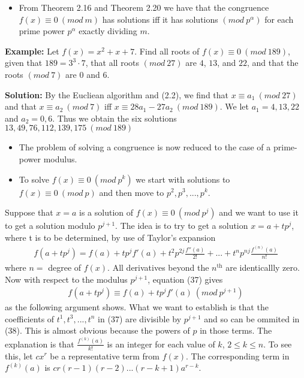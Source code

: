\documentclass[a4paper]{article}
\begin{document}
\begin{itemize}
    \item From Theorem 2.16 and Theorem 2.20 we have that the congruence $f(x)\equiv 0\ (mod\ m)$ has solutions iff it has solutions $(mod\ p^\alpha)$ for each prime power $p^\alpha$ exactly dividing $m$.
\end{itemize}

\textbf{Example:}
Let $f(x)=x^2+x+7$. Find all roots of $f(x)\equiv 0\ (mod\ 189)$, given that $189=3^3\cdot7$, that all roots $(mod\ 27)$ are $4$, $13$, and $22$, and that the roots $(mod\ 7)$ are $0$ and $6$.

\textbf{Solution:}
By the Eucliean algorithm and (2.2), we find that $x\equiv a_1\ (mod\ 27)$ and that $x\equiv a_2\ (mod\ 7)$ iff $x\equiv 28a_1-27a_2\ (mod\ 189)$. We let $a_1=4, 13, 22$ and $a_2=0, 6$. Thus we obtain the six solutions $13, 49, 76, 112, 139, 175\ (mod\ 189)$
\begin{itemize}
    \item The problem of solving a congruence is now reduced to the case of a prime-power modulus.
    \item To solve $f(x)\equiv 0\ (mod\ p^k)$ we start with solutions to $f(x)\equiv 0\ (mod\ p)$ and then move to $p^2, p^3,...,p^k$.
\end{itemize}

Suppose that $x=a$ is a solution of $f(x)\equiv 0\ (mod\ p^j)$ and we want to use it to get a solution modulo $p^{j+1}$. The idea is to try to get a solution $x=a+tp^j$, where t is to be determined, by use of Taylor's expansion
\begin{align}
    f(a+tp^j)=f(a)+tp^jf'(a)+t^2p^{2j}\frac{f''(a)}{2!}+...+t^np^{nj}\frac{f^{(n)}(a)}{n!}
\end{align}
where $n=$ degree of $f(x)$. All derivatives beyond the $n^\text{th}$ are identicallly zero. Now with respect to the modulus $p^{j+1}$, equation (37) gives
\begin{align}
    f(a+tp^j)\equiv f(a)+tp^jf'(a)\ (mod\ p^{j+1})
\end{align}
as the following argument shows. What we want to establish is that the coefficients of $t^1, t^3,..., t^n$ in (37) are divisible by $p^{j+1}$ and so can be ommited in (38). This is almost obvious because the powers of $p$ in those terms. The explanation is that $\frac{f^{(k)}(a)}{k!}$ is an integer for each value of $k$, $2\leq k\leq n$. To see this, let  $cx^r$ be a representative term from $f(x)$. The corresponding term in $f^{(k)}(a)$ is $cr(r-1)(r-2)...(r-k+1)a^{r-k}$.
\end{document}
